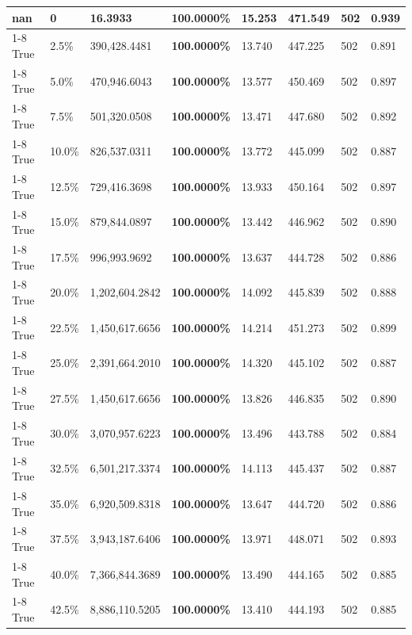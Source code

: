 \begin{table}[H]
{\begin{tabular}{lllrllll}
\midrule
nan & 0 & \bfseries 16.3933 & \bfseries 100.0000\% & 15.253 & 471.549 & 502 & 0.939 \\
\cline{1-8}
True & 2.5\% & 390,428.4481 & \bfseries \color{red} 100.0000\% & 13.740 & 447.225 & 502 & 0.891 \\
\cline{1-8}
True & 5.0\% & 470,946.6043 & \bfseries \color{red} 100.0000\% & 13.577 & 450.469 & 502 & 0.897 \\
\cline{1-8}
True & 7.5\% & 501,320.0508 & \bfseries \color{red} 100.0000\% & 13.471 & 447.680 & 502 & 0.892 \\
\cline{1-8}
True & 10.0\% & 826,537.0311 & \bfseries \color{red} 100.0000\% & 13.772 & 445.099 & 502 & 0.887 \\
\cline{1-8}
True & 12.5\% & 729,416.3698 & \bfseries \color{red} 100.0000\% & 13.933 & 450.164 & 502 & 0.897 \\
\cline{1-8}
True & 15.0\% & 879,844.0897 & \bfseries \color{red} 100.0000\% & 13.442 & 446.962 & 502 & 0.890 \\
\cline{1-8}
True & 17.5\% & 996,993.9692 & \bfseries \color{red} 100.0000\% & 13.637 & 444.728 & 502 & 0.886 \\
\cline{1-8}
True & 20.0\% & 1,202,604.2842 & \bfseries \color{red} 100.0000\% & 14.092 & 445.839 & 502 & 0.888 \\
\cline{1-8}
True & 22.5\% & 1,450,617.6656 & \bfseries \color{red} 100.0000\% & 14.214 & 451.273 & 502 & 0.899 \\
\cline{1-8}
True & 25.0\% & 2,391,664.2010 & \bfseries \color{red} 100.0000\% & 14.320 & 445.102 & 502 & 0.887 \\
\cline{1-8}
True & 27.5\% & 1,450,617.6656 & \bfseries \color{red} 100.0000\% & 13.826 & 446.835 & 502 & 0.890 \\
\cline{1-8}
True & 30.0\% & 3,070,957.6223 & \bfseries \color{red} 100.0000\% & 13.496 & 443.788 & 502 & 0.884 \\
\cline{1-8}
True & 32.5\% & 6,501,217.3374 & \bfseries \color{red} 100.0000\% & 14.113 & 445.437 & 502 & 0.887 \\
\cline{1-8}
True & 35.0\% & 6,920,509.8318 & \bfseries \color{red} 100.0000\% & 13.647 & 444.720 & 502 & 0.886 \\
\cline{1-8}
True & 37.5\% & 3,943,187.6406 & \bfseries \color{red} 100.0000\% & 13.971 & 448.071 & 502 & 0.893 \\
\cline{1-8}
True & 40.0\% & 7,366,844.3689 & \bfseries \color{red} 100.0000\% & 13.490 & 444.165 & 502 & 0.885 \\
\cline{1-8}
True & 42.5\% & 8,886,110.5205 & \bfseries \color{red} 100.0000\% & 13.410 & 444.193 & 502 & 0.885 \\

\end{tabular}}
\end{table}
